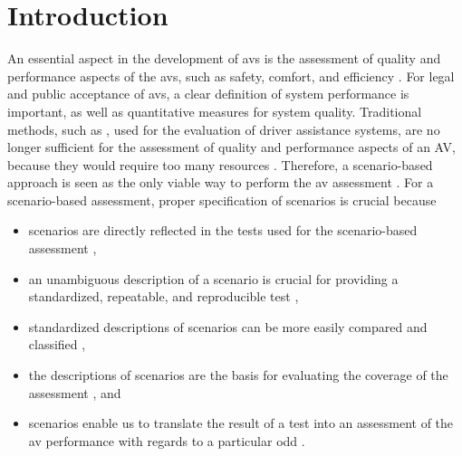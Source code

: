 \section{Introduction}
\label{sec:introduction}

An essential aspect in the development of \acp{av} is the assessment of quality and performance aspects of the \acp{av}, such as safety, comfort, and efficiency \autocite{bengler2014threedecades, wachenfeld2016release, Helmer2017safety, stellet2015taxonomy, gietelink2006development, putz2017pegasus, roesener2017comprehensive, riedmaier2020survey}.
For legal and public acceptance of \acp{av}, a clear definition of system performance is important, as well as quantitative measures for system quality. 
Traditional methods, such as \autocite{response2006code, ISO26262}, used for the evaluation of driver assistance systems, are no longer sufficient for the assessment of quality and performance aspects of an AV, because they would require too many resources \autocite{wachenfeld2016release}. 
\cstartc Therefore, a scenario-based approach is seen as the only viable way to perform the \ac{av} assessment \autocite{putz2017pegasus, elrofai2018scenario, riedmaier2020survey}. 
For a scenario-based assessment, proper specification of scenarios is crucial because 
\begin{itemize}
	\item scenarios are directly reflected in the tests used for the scenario-based assessment \autocite{stellet2015taxonomy, aparicio2013pre, ulbrich2015, geyer2014, putz2017pegasus, zofka2015datadrivetrafficscenarios},
	\item an unambiguous description of a scenario is crucial for providing a standardized, repeatable, and reproducible test \autocite{aparicio2013pre},
	\item standardized descriptions of scenarios can be more easily compared and classified \autocite{degelder2019scenariocategories},
	\item the descriptions of scenarios are the basis for evaluating the coverage of the assessment \autocite{putz2017pegasus}, and
	\item scenarios enable us to translate the result of a test into an assessment of the \ac{av} performance with regards to a particular \ac{odd} \autocite{weber2019framework, gyllenhammar2020towards}.
\end{itemize}

